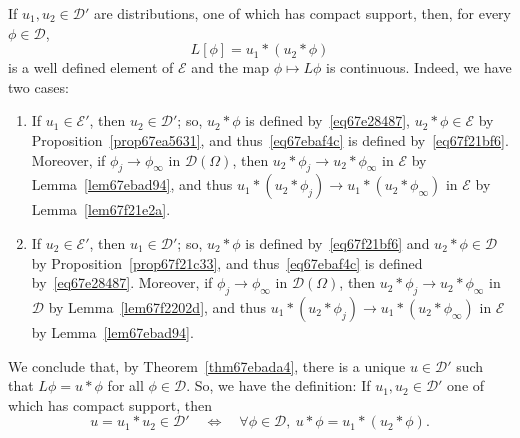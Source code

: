 \documentclass[a4paper,9pt]{amsart}
\newcommand{\scr}[1]{\mathscr{#1}}
\newcommand{\IFF}{\Leftrightarrow}	%
\theoremstyle{plain}
\theoremstyle{definition}
\theoremstyle{remark}
\begin{document}
If $u_1,u_2\in\scr D'$ are distributions, one of which has compact support, then,
 for every $\phi\in\scr D$,
\begin{equation}\label{eq67ebaf4c}
	L[\phi] = 
	u_1 * (u_2*\phi) 
\end{equation}
is a well defined element of $\scr E$ and the map $\phi\mapsto L\phi$ is continuous.
Indeed, we have two cases:
\begin{enumerate}
\item 
	If $u_1\in\scr E'$, then $u_2\in\scr D'$; so, $u_2*\phi$ is defined by~\eqref{eq67e28487}, $u_2*\phi\in\scr E$ by Proposition~\ref{prop67ea5631}, and thus~\eqref{eq67ebaf4c} is defined by~\eqref{eq67f21bf6}.
	Moreover, if $\phi_j\to\phi_\infty$ in $\scr D(\Omega)$, then $u_2*\phi_j\to u_2*\phi_\infty$ in $\scr E$ by Lemma~\ref{lem67ebad94},
	and thus $u_1 * (u_2*\phi_j) \to u_1 * (u_2*\phi_\infty)$ in $\scr E$ by Lemma~\ref{lem67f21e2a}.
\item 
	If $u_2\in\scr E'$, then $u_1\in\scr D'$; so, $u_2*\phi$ is defined by~\eqref{eq67f21bf6} and $u_2*\phi\in\scr D$ by Proposition~\ref{prop67f21c33}, and thus~\eqref{eq67ebaf4c} is defined by~\eqref{eq67e28487}.
	Moreover, if $\phi_j\to\phi_\infty$ in $\scr D(\Omega)$, then $u_2*\phi_j\to u_2*\phi_\infty$ in $\scr D$ by Lemma~\ref{lem67f2202d},
	and thus $u_1 * (u_2*\phi_j) \to u_1 * (u_2*\phi_\infty)$ in $\scr E$ by Lemma~\ref{lem67ebad94}.
\end{enumerate}
We conclude that, by Theorem~\ref{thm67ebada4}, there is a unique $u\in\scr D'$ such that $L\phi = u*\phi$ for all $\phi\in\scr D$.
So, we have the definition:
If $u_1,u_2\in\scr D'$ one of which has compact support, then
\begin{equation}
	u = u_1 * u_2 \in\scr D'
	\quad\IFF\quad
	\forall\phi\in\scr D,\ 
	u*\phi = u_1 * (u_2*\phi) .
\end{equation}

\end{document}
